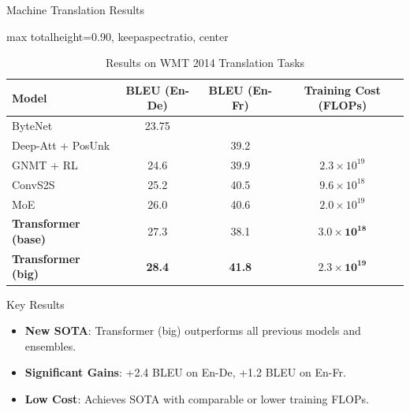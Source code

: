 \documentclass[
	11pt,
	aspectratio=169,
]{beamer}
\begin{document}
\begin{frame}{Machine Translation Results}
\begin{adjustbox}{max totalheight=0.90\textheight, keepaspectratio, center}
\begin{minipage}{\linewidth}
\centering
\vspace{-0.5em}
\begin{table}
\caption{Results on WMT 2014 Translation Tasks}
\centering
\begin{tabular}{l c c c}
\toprule
\textbf{Model} & \textbf{BLEU (En-De)} & \textbf{BLEU (En-Fr)} & \textbf{Training Cost (FLOPs)} \\
\midrule
ByteNet \cite{Kalchbrenner2016} & 23.75 & & \\
Deep-Att + PosUnk \cite{Zhou2016} & & 39.2 & \\
GNMT + RL \cite{Wu2016} & 24.6 & 39.9 & $2.3 \times 10^{19}$ \\
ConvS2S \cite{Gehring2017} & 25.2 & 40.5 & $9.6 \times 10^{18}$ \\
MoE \cite{Shazeer2017} & 26.0 & 40.6 & $2.0 \times 10^{19}$ \\
\midrule
\textbf{Transformer (base)} & 27.3 & 38.1 & $\mathbf{3.0 \times 10^{18}}$ \\
\textbf{Transformer (big)} & \textbf{28.4} & \textbf{41.8} & $\mathbf{2.3 \times 10^{19}}$ \\
\bottomrule
\end{tabular}
\end{table}

\vspace{-0.5em}
\begin{block}{Key Results}
\small
\begin{itemize}
\setlength{\itemsep}{0pt}
    \item \textbf{New SOTA}: Transformer (big) outperforms all previous models and ensembles.
    \item \textbf{Significant Gains}: +2.4 BLEU on En-De, +1.2 BLEU on En-Fr.
    \item \textbf{Low Cost}: Achieves SOTA with comparable or lower training FLOPs.
\end{itemize}
\end{block}
\end{minipage}
\end{adjustbox}
\end{frame}
\end{document}
